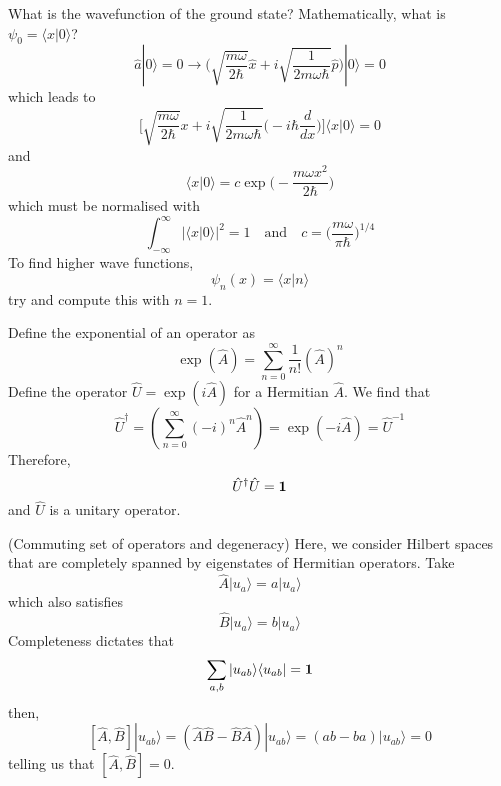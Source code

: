 \vspace{2ex}
\begin{thm}
What is the wavefunction of the ground state? Mathematically, what is $\psi _{0}=\langle x|0\rangle $? 
\[\hat{a}|0\rangle =0\rightarrow \Big(\sqrt{\dfrac{m\omega }{2\hbar }}\hat{x}+i\sqrt{\dfrac{1}{2m\omega \hbar }}\hat{p}\Big)|0\rangle=0 \]
which leads to
\[\Big[\sqrt{\dfrac{m\omega }{2\hbar }}x+i\sqrt{\dfrac{1}{2m\omega \hbar }}\Big(-i\hbar \dfrac{d }{d x} \Big)\Big]\langle x|0\rangle =0\]
and
\[\langle x|0\rangle =c\exp \Big(-\dfrac{m\omega x^2}{2\hbar }\Big)\]
which must be normalised with
\[\int ^{\infty }_{-\infty }|\langle x|0\rangle |^2=1\quad \mathrm{and}\quad c=\Big(\dfrac{m\omega }{\pi \hbar }\Big)^{1/4}\]
To find higher wave functions,
\[\psi _{n}(x)=\langle x|n\rangle\]
try and compute this with $n=1$. 
\end{thm}
\vspace{2ex}
\begin{defi}
Define the exponential of an operator as
\[\exp (\hat{A})=\sum ^{\infty }_{n=0}\dfrac{1}{n!}(\hat{A})^{n}\]
Define the operator $\hat{U}=\exp (i\hat{A})$ for a Hermitian $\hat{A}$. We find that
\[\hat{U}^{\dagger}=(\sum ^{\infty }_{n=0}(-i)^{n}\hat{A}^{n})=\exp (-i\hat{A})=\hat{U}^{-1}\]
Therefore,
\[\hat{U}^{\dagger}\hat{U}={\bf 1}\]
and $\hat{U}$ is a unitary operator. 
\end{defi}
\vspace{2ex}
\begin{thm}
(Commuting set of operators and degeneracy) Here, we consider Hilbert spaces that are completely spanned by eigenstates of Hermitian operators. Take 
\[\hat{A}|u_{a}\rangle =a|u_{a}\rangle \]
which also satisfies
\[\hat{B}|u_{a}\rangle =b|u_{a}\rangle \]
Completeness dictates that
\[\sum _{a,b}|u_{ab}\rangle \langle u_{ab}|={\bf 1}\]
then, 
\[[\hat{A},\hat{B}]|u_{ab}\rangle =(\hat{A}\hat{B}-\hat{B}\hat{A})|u_{ab}\rangle =(ab-ba)|u_{ab}\rangle =0\]
telling us that $[\hat{A},\hat{B}]=0$.
\end{thm}
\vspace{2ex}

